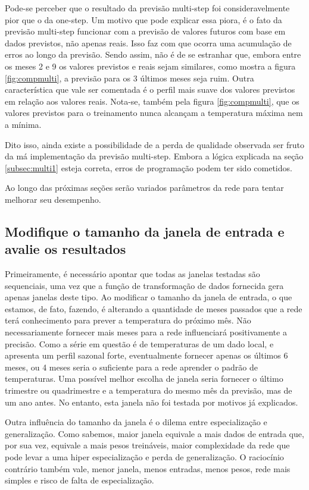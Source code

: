 \documentclass[12pt]{article}
\begin{document}
	Pode-se perceber que o resultado da previsão multi-step foi consideravelmente pior que o da one-step. Um motivo que pode explicar essa piora, é o fato da previsão multi-step funcionar com a previsão de valores futuros com base em dados previstos, não apenas reais. Isso faz com que ocorra uma acumulação de erros ao longo da previsão. Sendo assim, não é de se estranhar que, embora entre os meses 2 e 9 os valores previstos e reais sejam similares, como mostra a figura \ref{fig:compmulti}, a previsão para os 3 últimos meses seja ruim. Outra característica que vale ser comentada é o perfil mais suave dos valores previstos em relação aos valores reais. Nota-se, também pela figura \ref{fig:compmulti}, que os valores previstos para o treinamento nunca alcançam a temperatura máxima nem a mínima.
	
	Dito isso, ainda existe a possibilidade de a perda de qualidade observada ser fruto da má implementação da previsão multi-step. Embora a lógica explicada na seção \ref{subsec:multi1} esteja correta, erros de programação podem ter sido cometidos. 
	
	Ao longo das próximas seções serão variados parâmetros da rede para tentar melhorar seu desempenho.
	
	
	\subsection{Modifique o tamanho da janela de entrada e avalie os resultados}
	
	Primeiramente, é necessário apontar que todas as janelas testadas são sequenciais, uma vez que a função de transformação de dados fornecida gera apenas janelas deste tipo. Ao modificar o tamanho da janela de entrada, o que estamos, de fato, fazendo, é alterando a quantidade de meses passados que a rede terá conhecimento para prever a temperatura do próximo mês. Não necessariamente fornecer mais meses para a rede influenciará positivamente a precisão. Como a série em questão é de temperaturas de um dado local, e apresenta um perfil sazonal forte, eventualmente fornecer apenas os últimos 6 meses, ou 4 meses seria o suficiente para a rede aprender o padrão de temperaturas. Uma possível melhor escolha de janela seria fornecer o último trimestre ou quadrimestre e a temperatura do mesmo mês da previsão, mas de um ano antes. No entanto, esta janela não foi testada por motivos já explicados.
	
	Outra influência do tamanho da janela é o dilema entre especialização e generalização. Como sabemos, maior janela equivale a mais dados de entrada que, por sua vez, equivale a mais pesos treináveis, maior complexidade da rede que pode levar a uma hiper especialização e perda de generalização. O raciocínio contrário também vale, menor janela, menos entradas, menos pesos, rede mais simples e risco de falta de especialização.
	
\end{document}
